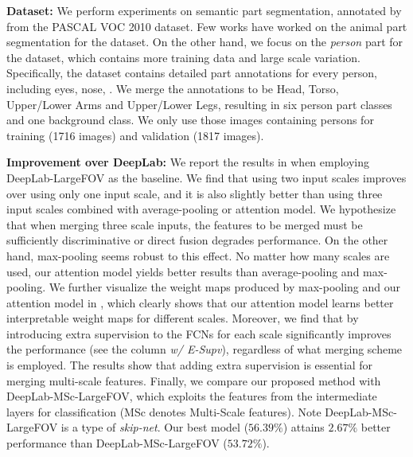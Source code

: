 \textbf{Dataset:} We perform experiments on semantic part segmentation, annotated by \cite{chen_cvpr14} from the PASCAL VOC 2010 dataset. Few works \cite{wang2014semantic, wang2015joint} have worked on the animal part segmentation for the dataset. On the other hand, we focus on the {\it person} part for the dataset, which contains more training data and large scale variation. Specifically, the dataset contains detailed part annotations for every person, including eyes, nose, \etc. We merge the annotations to be Head, Torso, Upper/Lower Arms and Upper/Lower Legs, resulting in six person part classes and one background class. We only use those images containing persons for training (1716 images) and validation (1817 images).

\textbf{Improvement over DeepLab:} We report the results in  when employing DeepLab-LargeFOV as the baseline. We find that using two input scales improves over using only one input scale, and it is also slightly better than using three input scales combined with average-pooling or attention model. We hypothesize that when merging three scale inputs, the features to be merged must be sufficiently discriminative or direct fusion degrades performance. On the other hand,
max-pooling seems robust to this effect. No matter how many scales are used, our attention model yields better results than average-pooling and max-pooling. We further visualize the weight maps produced by max-pooling and our attention model in , which clearly shows that our attention model learns better interpretable weight maps for different scales. Moreover, we find that by introducing extra supervision to the FCNs for
each scale significantly improves the performance (see the column {\it w/ E-Supv}), regardless of what merging scheme is employed. The results show that adding extra supervision is essential for merging multi-scale features. Finally, we compare our proposed method with DeepLab-MSc-LargeFOV, which exploits the features from the intermediate layers for classification (MSc denotes Multi-Scale features). Note DeepLab-MSc-LargeFOV is a type of {\it skip-net}. Our best model ($56.39\%$) attains $2.67\%$ better performance than DeepLab-MSc-LargeFOV ($53.72\%$).

